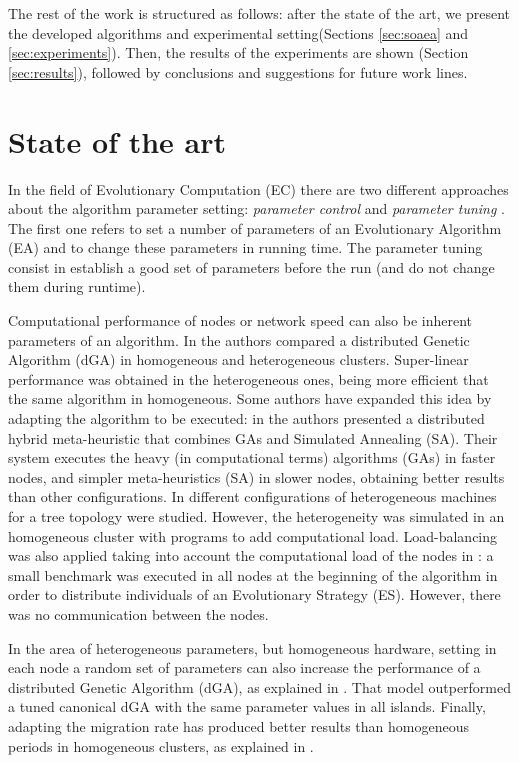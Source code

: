The rest of the work is structured as follows: after the state of
the art, we present the developed algorithms and experimental setting(Sections \ref{sec:soaea} and \ref{sec:experiments}). 
Then, the results of the experiments are shown (Section \ref{sec:results}), followed by conclusions and suggestions for future work lines.


%
\section{State of the art}
\label{sec:soa}
%

In the field of  Evolutionary Computation (EC) there are two different approaches about the algorithm parameter setting: {\em parameter control} and {\em parameter tuning} \cite{PARAMETERTUNING}. The first one refers to set a number of parameters of an Evolutionary Algorithm (EA) and to change these parameters in running time. The parameter tuning consist in establish a good set of parameters before the run (and do not change them during runtime).

 Computational performance of nodes or network speed can also be inherent parameters of an algorithm. In \cite{HETEROGENEOUSHARD} the authors compared a distributed Genetic Algorithm (dGA) in homogeneous and heterogeneous clusters. Super-linear performance was obtained in the heterogeneous ones, being more efficient that the same algorithm in homogeneous. Some authors have expanded this idea by adapting the algorithm to be executed: in \cite{HYDROCM} the authors presented a distributed hybrid meta-heuristic that combines GAs and Simulated Annealing (SA). Their system executes the heavy (in computational terms) algorithms (GAs) in faster nodes, and simpler meta-heuristics (SA) in slower nodes, obtaining better results than other configurations. In \cite{HETEROGENEOUSTOPOLOGY} different configurations of heterogeneous machines for a tree topology were studied. However, the heterogeneity was simulated in an homogeneous cluster with programs to add computational load. Load-balancing was also applied taking into account the computational load of the nodes in \cite{PARALLELIMPLEMENTATION}: a small benchmark was executed in all nodes at the beginning of the algorithm in order to distribute individuals of an Evolutionary Strategy (ES). However, there was no communication between the nodes. 

In the area of heterogeneous parameters, but homogeneous hardware, setting in each node a random set of parameters can also increase the performance of a distributed Genetic Algorithm (dGA), as explained in \cite{HETEROGENEOUSPARAMETERS}. That model outperformed a tuned canonical dGA with the same parameter values in all islands. Finally, adapting the migration rate has produced better results than homogeneous periods in homogeneous clusters, as explained in \cite{HETEROGENEOUSMIGRATION}.

